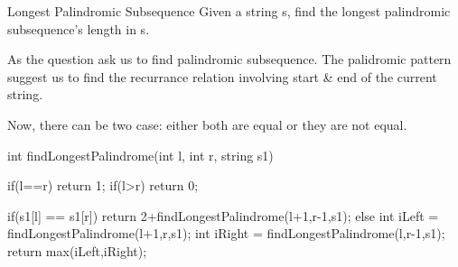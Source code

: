 
\begin{problem}{Longest Palindromic Subsequence}
    Given a string s, find the longest palindromic subsequence's length in s.

\end{problem}

\begin{solution}[Recursive]

    As the question ask us to find palindromic subsequence.  The palidromic pattern suggest us to find the recurrance relation involving start \& end of the current string.


    Now, there can be two case: either both are equal or they are not equal.

    \begin{code}
    int findLongestPalindrome(int l, int r, string s1)
    {
        if(l==r)
            return 1;
        if(l>r)
            return 0;
        
        if(s1[l] == s1[r])
            return 2+findLongestPalindrome(l+1,r-1,s1);
        else
        {
            int iLeft = findLongestPalindrome(l+1,r,s1);
            int iRight = findLongestPalindrome(l,r-1,s1);
            return max(iLeft,iRight);
        }
    }
    \end{code}
\end{solution}

